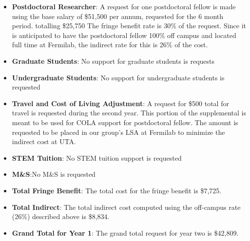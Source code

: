 \begin{enumerate}
\begin{itemize}[noitemsep,nolistsep]
\item {{\bf Postdoctoral Researcher}: A request for one postdoctoral fellow is made using the base salary of \$51,500 per annum, requested for the 6 month period. totalling \$25,750  The fringe benefit rate is 30\% of the request. Since it is anticipated to have the postdoctoral fellow 100\% off campus and located full time at Fermilab, the indirect rate for this is 26\% of the cost.} 


\item{{\bf Graduate Students}: No support for graduate students is requests}

\item {{\bf Undergraduate Students}: No support for undergraduate students is requested}

\item{{\bf Travel and Cost of Living Adjustment}: A request for \$500 total for travel is requested during the second year.  This portion of the supplemental is meant to be used for COLA support for postdoctoral fellow. The amount is requested to be placed in our group’s LSA at Fermilab to minimize the indirect cost at UTA.}

\item {{\bf STEM Tuition}: No STEM tuition support is requested}

\item {{\bf M\&S}:No M\&S is requested}

\item {{\bf Total Fringe Benefit}: The total cost for the fringe benefit is \$7,725.}

\item {{\bf Total Indirect}: The total indirect cost computed using the off-campus rate (26\%) described above is \$8,834.}

\item {{\bf Grand Total for Year 1}: The grand total request for year two is \$42,809.}

\end{itemize}

\end{enumerate}
